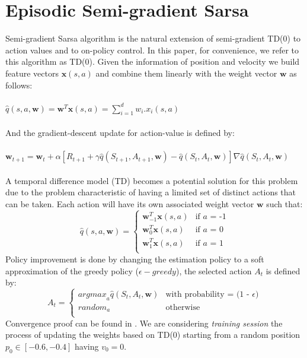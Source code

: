 \documentclass[10pt,twocolumn]{article}
\begin{document}
\section{Episodic Semi-gradient Sarsa}
Semi-gradient Sarsa algorithm is the natural extension of semi-gradient TD(0) to action values and to on-policy
control. \cite{Sutton1998} In this paper, for convenience, we refer to this algorithm as TD(0). Given the information of position and velocity we build feature vectors $\mathbf{x}(s,a)$ 
and combine them linearly with the weight vector $\mathbf{w}$ as follows:
\\ \\
$\hat{q}(s, a, \mathbf{w}) = \mathbf{w}^T \mathbf{x}(s,a) = \sum_{i=1}^{d} w_i . x_i(s,a)$
\\ \\
And the gradient-descent update for action-value is defined by:
\\ \\
$\mathbf{w}_{t+1} = \mathbf{w}_{t} + \alpha[R_{t+1} + \gamma \hat{q}(S_{t+1}, A_{t+1}, \mathbf{w}) - \hat{q}(S_{t}, A_{t}, \mathbf{w})] \nabla \hat{q}(S_{t}, A_{t}, \mathbf{w})$
\\ \\
A temporal difference model (TD) becomes a potential solution for this problem due to the problem characteristic of having a limited set of distinct actions that can be taken. 
Each action will have its own associated weight vector $\mathbf{w}$ such that:
\[
\hat{q}(s, a, \mathbf{w}) = \begin{cases}
  \mathbf{w}_{-1}^T \mathbf{x}(s,a) & \text{if \(a\) = -1} \\
  \mathbf{w}_{0}^T \mathbf{x}(s,a) & \text{if \(a\) = 0} \\
  \mathbf{w}_{1}^T \mathbf{x}(s,a) & \text{if \(a\) = 1} \\
\end{cases}
\]
Policy improvement is done by changing the estimation policy to a soft approximation of the greedy policy ($\epsilon-greedy$), the selected action $A_{t}$ is defined by:
\[
A_{t} = \begin{cases}
  {argmax}_{a} \hat{q}(S_{t}, A_{t}, \mathbf{w}) & \text{with probability = (1 - $\epsilon$)} \\
  {random}_{a} & \text{otherwise} \\
\end{cases}
\]
Convergence proof can be found in \cite{QLearning}. 
We are considering \emph{training session} the process of updating the weights based on TD(0) starting from a random position $p_{0}\in[-0.6,-0.4]$ having $v_{0} = 0$. 
\end{document}
